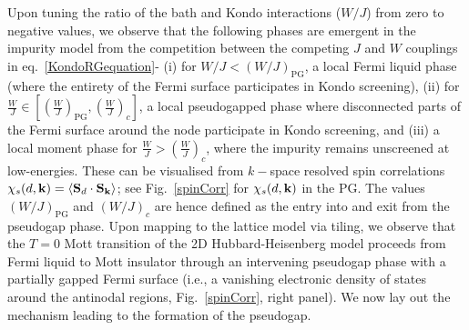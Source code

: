 \documentclass[%
 reprint,
superscriptaddress,
groupedaddress,
 amsmath,amssymb,
 aps,
prl
]{revtex4-2}
\begin{document}
Upon tuning the ratio of the bath and Kondo interactions ($W/J$) from zero to negative values, we observe that the following phases are emergent in the impurity model from the competition between the competing $J$ and $W$ couplings in eq.~\eqref{KondoRGequation}- (i) for $W/J<(W/J)_{\text{PG}}$, a local Fermi liquid phase (where the entirety of the Fermi surface participates in Kondo screening), (ii) for $\frac{W}{J} \in [(\frac{W}{J})_{\text{PG}}, (\frac{W}{J})_c]$, a local pseudogapped phase where disconnected parts of the Fermi surface around the node participate in Kondo screening, and (iii) a local moment phase for $\frac{W}{J} > (\frac{W}{J})_c$, where the impurity remains unscreened at low-energies. These can be visualised from $k-$space resolved spin correlations $\chi_s(d,{\bf k}) = \braket{{\bf S}_d\cdot{\bf S}_{\bf k}}$; see Fig.~\ref{spinCorr} for $\chi_s(d,{\bf k})$ in the PG. The values $(W/J)_{\text{PG}}$ and $(W/J)_c$ are hence defined as the entry into and exit from
the pseudogap phase. %
Upon mapping to the lattice model via tiling, we %
observe that the $T=0$ Mott transition 
of the 2D Hubbard-Heisenberg model proceeds from Fermi liquid to Mott insulator through an intervening pseudogap phase
with a partially gapped Fermi surface (i.e., a vanishing electronic density of states around the antinodal regions, Fig.~\ref{spinCorr}, right panel). 
We now lay out the mechanism leading to the formation of the pseudogap. 
\end{document}
